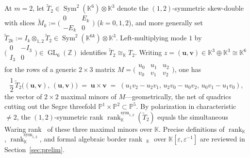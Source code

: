 \documentclass[11pt,reqno]{amsart}
\theoremstyle{definition}
\theoremstyle{remark}
\numberwithin{equation}{section}
\newcommand{\KK}{\mathbb{K}}
\newcommand{\ZZ}{\mathbb{Z}}
\newcommand{\PP}{\mathbb{P}}
\DeclareMathOperator{\rk}{rank}
\DeclareMathOperator{\brk}{\underline{rank}}
\DeclareMathOperator{\Sym}{Sym}
\DeclareMathOperator{\GL}{GL}
\begin{document}
At $m = 2$, let $\widetilde{T}_2 \in \Sym^2(\KK^6) \otimes \KK^3$ denote the $(1,2)$-symmetric skew-double with slices $\widetilde{M}_k := \bigl(\begin{smallmatrix} 0 & E_k \\ -E_k & 0 \end{smallmatrix}\bigr)$ ($k = 0, 1, 2$), and more generally set $\widetilde{T}_{2k} := I_k \otimes_{1,2} \widetilde{T}_2 \in \Sym^2(\KK^{6k}) \otimes \KK^3$. Left-multiplying mode $1$ by $\bigl(\begin{smallmatrix} 0 & -I_3 \\ I_3 & 0 \end{smallmatrix}\bigr) \in \GL_6(\ZZ)$ identifies $\widetilde{T}_2 \cong_{\KK} T_2$. Writing $z = (\mathbf{u}, \mathbf{v}) \in \KK^3 \oplus \KK^3 \cong \KK^6$ for the rows of a generic $2 \times 3$ matrix $M = \bigl(\begin{smallmatrix} u_0 & u_1 & u_2 \\ v_0 & v_1 & v_2 \end{smallmatrix}\bigr)$, one has
\begin{equation}\label{eq:minors-polarization}
  \frac{1}{2}\,\widetilde{T}_2\bigl((\mathbf{u}, \mathbf{v}),\, (\mathbf{u}, \mathbf{v})\bigr)
  \;=\; \mathbf{u} \times \mathbf{v}
  \;=\; (u_1 v_2 - u_2 v_1,\, u_2 v_0 - u_0 v_2,\, u_0 v_1 - u_1 v_0),
\end{equation}
the vector of $2 \times 2$ maximal minors of $M$---geometrically, the net of quadrics cutting out the Segre threefold $\PP^1 \times \PP^2 \subset \PP^5$. By polarization in characteristic $\neq 2$, the $(1,2)$-symmetric rank $\rk_{\KK}^{\mathrm{sym}_{1,2}}(\widetilde{T}_2)$ equals the simultaneous Waring rank~\cite{Teitler2014} of these three maximal minors over $\KK$. Precise definitions of $\rk_{\KK}$, $\rk_{\KK}^{\mathrm{sym}_{1,2}}$, and formal algebraic border rank $\brk_{\KK}$ over $\KK[\varepsilon, \varepsilon^{-1}]$ are reviewed in Section~\ref{sec:prelim}.
\end{document}
